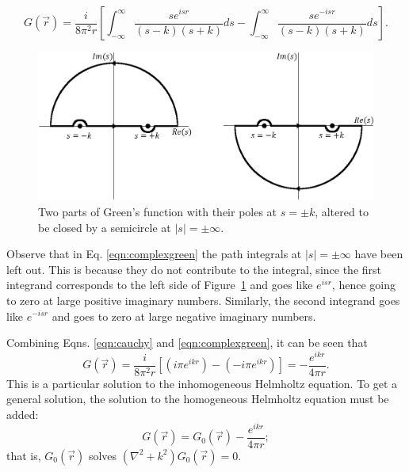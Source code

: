 %
\begin{equation}
\label{eqn:complexgreen}
G(\vec{r})=\frac{i}{8\pi^2r}\left[ \int_{-\infty}^\infty \frac{se^{isr}}{(s-k)(s+k)}ds-\int_{-\infty}^\infty \frac{se^{-isr}}{(s-k)(s+k)}ds \right].
\end{equation}
%
\begin{figure}
  \centering
    \includegraphics[width=\textwidth]{Figures/complexgreen} 
  \caption{Two parts of Green's function with their poles at $s=\pm k$, altered to be closed by a semicircle at $|s|=\pm\infty$.}
  \label{fig:complexgreen}
\end{figure}

Observe that in Eq. \eqref{eqn:complexgreen} the path integrals at $|s|=\pm\infty$ have been left out. This is because they do not contribute to the integral, since the first integrand corresponds to the left side of Figure~\ref{fig:complexgreen} and goes like $e^{isr}$, hence going to zero at large positive imaginary numbers. Similarly, the second integrand goes like $e^{-isr}$ and goes to zero at large negative imaginary numbers.

Combining Eqns. \ref{eqn:cauchy} and \ref{eqn:complexgreen}, it can be seen that
%
\begin{equation}
\nonumber
G(\vec{r})=\frac{i}{8\pi^2r}[(i\pi e^{ikr})-(-i\pi e^{ikr})]=-\frac{e^{ikr}}{4\pi r}.
\end{equation}
This is a particular solution to the inhomogeneous Helmholtz equation. To get a general solution, the solution to the homogeneous Helmholtz equation must be added:
%
\begin{equation}
\label{eqn:greensolution}
G(\vec{r})=G_0(\vec{r})-\frac{e^{ikr}}{4\pi r};
\end{equation}
that is, $G_0(\vec{r})$ solves $(\nabla^2+k^2)G_0(\vec{r})=0$.

